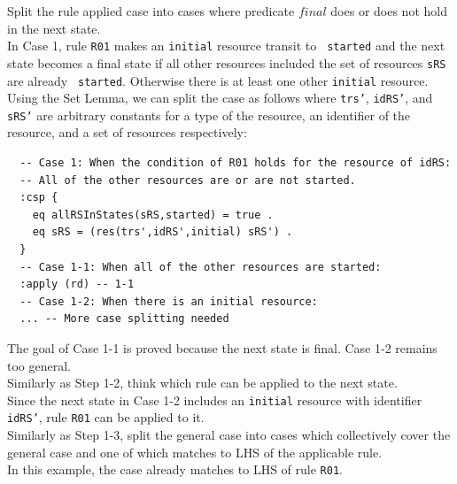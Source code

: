 \documentclass[12pt]{report}
\begin{document}
 Split the rule applied case into cases where
predicate $final$ does or does not hold in the next state.\\ In Case
1, rule {\tt R01} makes an {\tt initial} resource transit to {\tt
  started} and the next state becomes a final state if all other
resources included the set of resources {\tt sRS} are already {\tt
  started}. Otherwise there is at least one other {\tt initial}
resource.  Using the Set Lemma, we can split the case as follows where
{\tt trs'}, {\tt idRS'}, and {\tt sRS'} are arbitrary constants for a
type of the resource, an identifier of the resource, and a set of
resources respectively:
\small
\begin{verbatim}
  -- Case 1: When the condition of R01 holds for the resource of idRS:
  -- All of the other resources are or are not started.
  :csp {
    eq allRSInStates(sRS,started) = true .
    eq sRS = (res(trs',idRS',initial) sRS') .
  }
  -- Case 1-1: When all of the other resources are started:
  :apply (rd) -- 1-1
  -- Case 1-2: When there is an initial resource:
  ... -- More case splitting needed
\end{verbatim}
\normalsize
The goal of Case 1-1 is proved because the next state is final.  Case
1-2 remains too general.\\

 Similarly as Step 1-2, think which rule can
be applied to the next state. \\ Since the next state in Case 1-2
includes an {\tt initial} resource with identifier {\tt idRS'}, rule
{\tt R01} can be applied to it.\\

 Similarly as Step 1-3, split the general case
into cases which collectively cover the general case and one of which
matches to LHS of the applicable rule. \\ In this example, the case
already matches to LHS of rule {\tt R01}.\\
\end{document}
